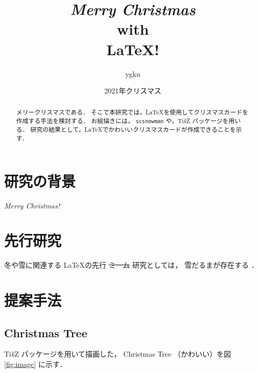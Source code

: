 \documentclass[a5paper, 12pt, uplatex, landscape]{jsarticle}
\title{
\Huge
{\color{red} \textit{Merry Christmas}} \\
with \\
{\color{green} \LaTeX !}
}
\date{2021年クリスマス}
\author{ygkn}
\begin{document}
\maketitle

\begin{abstract}
  メリークリスマスである．
  そこで本研究では，\LaTeX を使用してクリスマスカードを作成する手法を検討する．
  お絵描きには，
  \texttt{scsnowman} や，Ti\textit{k}Z パッケージを用いる．
  研究の結果として，\LaTeX でかわいいクリスマスカードが作成できることを示す．
\end{abstract}

\twocolumn[
]


\section{研究の背景}

\textit{Merry Christmas!}

\section{先行研究}

冬や雪に関連する \LaTeX の先行 \sout{ミーム} 研究としては，
雪だるまが存在する \cite{tex-meme} ．

\section{提案手法}


\subsection{Christmas Tree}

Ti\textit{k}Z パッケージを用いて描画した，
Christmas Tree （かわいい）を図 \ref{fig:image} に示す．
\end{document}
